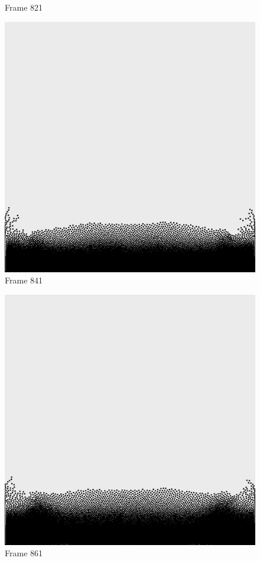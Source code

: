\documentclass[a4paper, 12pt, oneside]{book}
\begin{document}
\begin{figure}[!ht]
\begin{center}
            Frame 821
        \end{center}
    \endminipage
    \hfill
        \begin{center}
            \includegraphics[width=\linewidth]{images/test_case_1/841.png}
            Frame 841
        \end{center}
    \endminipage
    \hfill
        \begin{center}
            \includegraphics[width=\linewidth]{images/test_case_1/861.png}
            Frame 861
        \end{center}
    \endminipage
    \hfill


\end{figure}
\end{document}
